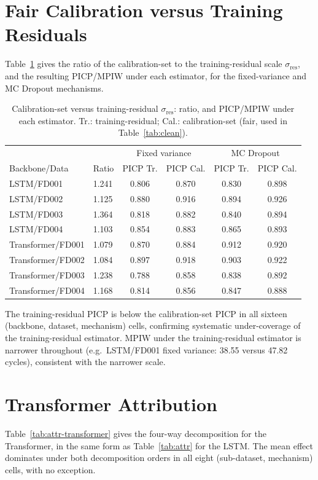 \documentclass[journal]{IEEEtran}
\newcommand{\PICP}{\mathrm{PICP}}\newcommand{\MPIW}{\mathrm{MPIW}}\newcommand{\ECE}{\mathrm{ECE}}
\begin{document}
\section{Fair Calibration versus Training Residuals}
\label{app:fair}
Table~\ref{tab:fair} gives the ratio of the calibration-set to the training-residual scale $\sigma_{\mathrm{res}}$, and the resulting $\PICP$/$\MPIW$ under each estimator, for the fixed-variance and MC Dropout mechanisms.

\begin{table}[!t]
\caption{Calibration-set versus training-residual $\sigma_{\mathrm{res}}$: ratio, and $\PICP$/$\MPIW$ under each estimator. Tr.: training-residual; Cal.: calibration-set (fair, used in Table~\ref{tab:clean}).}
\label{tab:fair}
\centering\small
\begin{tabular}{llcccc}
\toprule
 & & \multicolumn{2}{c}{Fixed variance} & \multicolumn{2}{c}{MC Dropout} \\
Backbone/Data & Ratio & $\PICP$ Tr. & $\PICP$ Cal. & $\PICP$ Tr. & $\PICP$ Cal. \\
\midrule
LSTM/FD001 & 1.241 & 0.806 & 0.870 & 0.830 & 0.898 \\
LSTM/FD002 & 1.125 & 0.880 & 0.916 & 0.894 & 0.926 \\
LSTM/FD003 & 1.364 & 0.818 & 0.882 & 0.840 & 0.894 \\
LSTM/FD004 & 1.103 & 0.854 & 0.883 & 0.865 & 0.893 \\
Transformer/FD001 & 1.079 & 0.870 & 0.884 & 0.912 & 0.920 \\
Transformer/FD002 & 1.084 & 0.897 & 0.918 & 0.903 & 0.922 \\
Transformer/FD003 & 1.238 & 0.788 & 0.858 & 0.838 & 0.892 \\
Transformer/FD004 & 1.168 & 0.814 & 0.856 & 0.847 & 0.888 \\
\bottomrule
\end{tabular}
\end{table}

The training-residual $\PICP$ is below the calibration-set $\PICP$ in all sixteen (backbone, dataset, mechanism) cells, confirming systematic under-coverage of the training-residual estimator. $\MPIW$ under the training-residual estimator is narrower throughout (e.g.\ LSTM/FD001 fixed variance: 38.55 versus 47.82 cycles), consistent with the narrower scale.

\section{Transformer Attribution}
\label{app:attr}
Table~\ref{tab:attr-transformer} gives the four-way decomposition for the Transformer, in the same form as Table~\ref{tab:attr} for the LSTM. The mean effect dominates under both decomposition orders in all eight (sub-dataset, mechanism) cells, with no exception.
\end{document}
